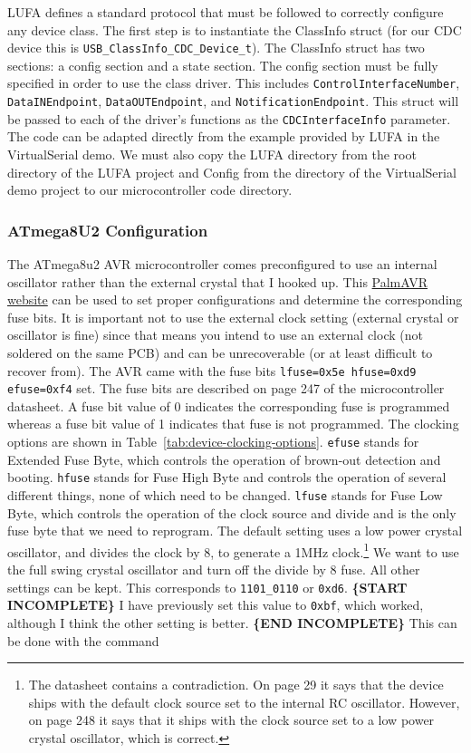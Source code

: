 \documentclass[11pt,twoside,a4paper]{report}
\begin{document}
LUFA defines a standard protocol that must be followed to correctly configure any device class. The
first step is to instantiate the ClassInfo struct (for our CDC device this is
\lstinline{USB_ClassInfo_CDC_Device_t}). The ClassInfo struct has two sections: a config section and
a state section. The config section must be fully specified in order to use the class driver. This
includes \lstinline{ControlInterfaceNumber}, \lstinline{DataINEndpoint},
\lstinline{DataOUTEndpoint}, and \lstinline{NotificationEndpoint}. This struct will be passed to
each of the driver's functions as the \lstinline{CDCInterfaceInfo} parameter. The code can be
adapted directly from the example provided by LUFA in the VirtualSerial demo. We must also copy the
LUFA directory from the root directory of the LUFA project and Config from the directory of the
VirtualSerial demo project to our microcontroller code directory.


\subsubsection{ATmega8U2 Configuration}
The ATmega8u2 AVR microcontroller comes preconfigured to use an internal oscillator rather than the
external crystal that I hooked up. This \href{http://www.engbedded.com/fusecalc/}{PalmAVR website}
can be used to set proper configurations and determine the corresponding fuse bits. It is important
not to use the external clock setting (external crystal or oscillator is fine) since that means you
intend to use an external clock (not soldered on the same PCB) and can be unrecoverable (or at least
difficult to recover from). The AVR came with the fuse bits
\lstinline{lfuse=0x5e hfuse=0xd9 efuse=0xf4} set. The fuse bits are described on page 247 of the
microcontroller datasheet. A fuse bit value of 0 indicates the corresponding fuse is programmed
whereas a fuse bit value of 1 indicates that fuse is not programmed. The clocking options are shown
in Table~\ref{tab:device-clocking-options}. \lstinline{efuse} stands for Extended Fuse Byte, which
controls the operation of brown-out detection and booting. \lstinline{hfuse} stands for Fuse High
Byte and controls the operation of several different things, none of which need to be
changed. \lstinline{lfuse} stands for Fuse Low Byte, which controls the operation of the clock
source and divide and is the only fuse byte that we need to reprogram. The default setting uses a
low power crystal oscillator, and divides the clock by 8, to generate a 1MHz clock.\footnote{The
  datasheet contains a contradiction. On page 29 it says that the device ships with the default
  clock source set to the internal RC oscillator. However, on page 248 it says that it ships with
  the clock source set to a low power crystal oscillator, which is correct.} We want to use the full
swing crystal oscillator and turn off the divide by 8 fuse. All other settings can be kept. This
corresponds to \lstinline{1101_0110} or \lstinline{0xd6}. \textbf{\{START INCOMPLETE\}} I have
previously set this value to \lstinline{0xbf}, which worked, although I think the other setting is
better. \textbf{\{END INCOMPLETE\}} This can be done with the command
\end{document}
